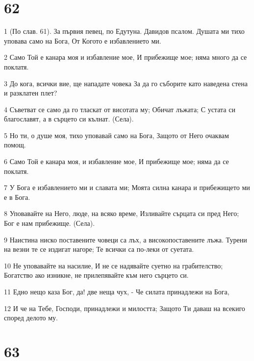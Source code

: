 \chapter{62}

\par 1 (По слав. 61). За първия певец, по Едутуна. Давидов псалом. Душата ми тихо уповава само на Бога, От Когото е избавлението ми.
\par 2 Само Той е канара моя и избавление мое, И прибежище мое; няма много да се поклатя.
\par 3 До кога, всички вие, ще нападате човека За да го съборите като наведена стена и разклатен плет?
\par 4 Съветват се само да го тласкат от висотата му; Обичат лъжата; С устата си благославят, а в сърцето си кълнат. (Села).
\par 5 Но ти, о душе моя, тихо уповавай само на Бога, Защото от Него очаквам помощ.
\par 6 Само Той е канара моя, и избавление мое, И прибежище мое; няма да се поклатя.
\par 7 У Бога е избавлението ми и славата ми; Моята силна канара и прибежището ми е в Бога.
\par 8 Уповавайте на Него, люде, на всяко време, Изливайте сърцата си пред Него; Бог е нам прибежище. (Села).
\par 9 Наистина ниско поставените човеци са лъх, а високопоставените лъжа. Турени на везни те се издигат нагоре; Те всички са по-леки от суетата.
\par 10 Не уповавайте на насилие, И не се надявайте суетно на грабителство; Богатство ако изникне, не прилепявайте към него сърцето си.
\par 11 Едно нещо каза Бог, да! две неща чух, - Че силата принадлежи на Бога,
\par 12 И че на Тебе, Господи, принадлежи и милостта; Защото Ти даваш на всекиго според делото му.

\chapter{63}

